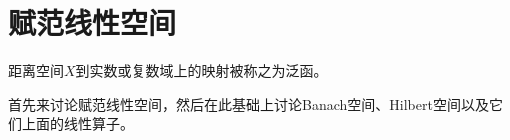 \chapter{赋范线性空间}

距离空间$X$到实数或复数域上的映射被称之为泛函。

首先来讨论赋范线性空间，然后在此基础上讨论Banach空间、Hilbert空间以及它们上面的线性算子。

















